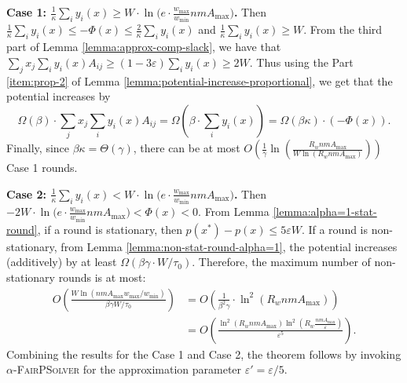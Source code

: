 \documentclass[11pt]{article}
\makeatletter
\newcommand{\wratio}{R_w}
\newenvironment{proofof}[1]{\par
  \pushQED{\qed}\normalfont \topsep3\p@\relax
  \trivlist
  \item[\hskip\labelsep
        \bfseries
    Proof of #1\@addpunct{.}]\ignorespaces
}{\popQED\endtrivlist\@endpefalse
}
\makeatother
\begin{document}
\begin{proofof}{Theorem \ref{thm:convergence-alpha=1}}
\noindent\textbf{Case 1: $\frac{1}{\kappa}\sum_i y_i(x)\geq W\cdot \ln\Big(e\cdot\frac{w_{\max}}{ w_{\min}}nmA_{\max}\Big)$.}  Then $\frac{1}{\kappa}\sum_i y_i(x)\leq -\Phi(x)\leq \frac{2}{\kappa}\sum_i y_i(x)$ and $\frac{1}{\kappa}\sum_i y_i(x)\geq W$. From the third part of Lemma \ref{lemma:approx-comp-slack}, we have that $\sum_j x_j \sum_iy_i(x)A_{ij}\geq (1-3\varepsilon)\sum_i y_i(x) \geq 2W$. Thus using the Part \ref{item:prop-2} of Lemma \ref{lemma:potential-increase-proportional}, we get that the potential increases by 
\begin{equation*}
\Omega(\beta)\cdot \sum_j x_j \sum_i y_i(x)A_{ij} = \Omega\left(\beta\cdot \sum_i y_i(x)\right)= \Omega(\beta\kappa)\cdot (-\Phi(x)).
\end{equation*}
Finally, since $\beta\kappa = \Theta(\gamma)$, there can be at most $O\left(\frac{1}{\gamma}\ln\left(\frac{\wratio nmA_{\max}}{W\ln(\wratio nmA_{\max})}\right)\right)$ Case 1 rounds.

\noindent\textbf{Case 2: $\frac{1}{\kappa}\sum_i y_i(x) < W\cdot \ln\Big(e\cdot\frac{w_{\max}}{ w_{\min}}nmA_{\max}\Big)$.}  Then $-2W\cdot \ln\Big(e\cdot\frac{w_{\max}}{ w_{\min}}nmA_{\max}\Big) < \Phi(x) < 0$. From Lemma \ref{lemma:alpha=1-stat-round}, if a round is stationary, then $p(x^*) - p(x)\leq 5\varepsilon W$. If a round is non-stationary, from Lemma \ref{lemma:non-stat-round-alpha=1}, the potential increases (additively) by at least $\Omega(\beta\gamma\cdot W/\tau_0)$. Therefore, the maximum number of non-stationary rounds is at most:
\begin{align*}
O\left(\frac{W\ln(nm{A_{\max}}w_{\max}/ w_{\min})}{\beta\gamma W/\tau_0}\right) & = O\left(\frac{1}{\beta^2\gamma}\cdot \ln^2\left(\wratio nmA_{\max}\right)\right)\\
&= O\left(\frac{\ln^2\left(\wratio nmA_{\max}\right)\ln^2\left(\wratio\frac{nmA_{\max}}{\varepsilon}\right)}{\varepsilon^5}\right).
\end{align*}
Combining the results for the Case 1 and Case 2, the theorem follows by invoking \textsc{$\alpha$-FairPSolver} for the approximation parameter $\varepsilon' = \varepsilon/5$.
\end{proofof}
\end{document}
